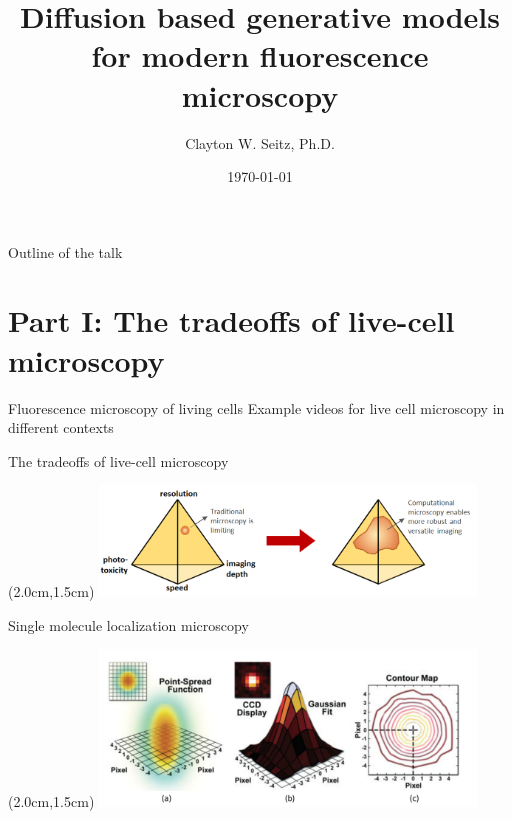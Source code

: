 \documentclass{beamer}					%
\title{Diffusion based generative models for modern fluorescence microscopy}	%
\author{Clayton W. Seitz, Ph.D.}								%
\date{\today}									%
\begin{document}
\begin{frame}
  \titlepage
\end{frame}

\begin{frame}{Outline of the talk}
    \tableofcontents
\end{frame}



%


\section{Part I: The tradeoffs of live-cell microscopy}

\begin{frame}{Fluorescence microscopy of living cells}
Example videos for live cell microscopy in different contexts
\end{frame}

\begin{frame}{The tradeoffs of live-cell microscopy}
\begin{textblock*}{10cm}(2.0cm,1.5cm)
\includegraphics[width=10cm]{../../postdoc/sartorius/media/Tradeoff.png}
\end{textblock*}
\end{frame}

\begin{frame}{Single molecule localization microscopy}
\begin{textblock*}{10cm}(2.0cm,1.5cm)
\includegraphics[width=10cm]{../../postdoc/sartorius/media/SMLM.png}
\end{textblock*}
\end{frame}
\end{document}
